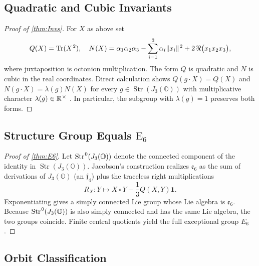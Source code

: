 \documentclass[pdflatex,sn-mathphys-num]{sn-jnl}
\theoremstyle{thmstyleone}
\theoremstyle{thmstyletwo}%
\theoremstyle{thmstylethree}%
\newcommand{\E}[1]{\mathrm{E_{#1}}}
\newcommand{\jalg}{J_3(\mathbb{O})}
\newcommand{\ESix}{\E{6}}
\newcommand{\Tr}{\operatorname{Tr}}
\newcommand{\sm}{\hspace{.065em}}
\newcommand{\Str}{\operatorname{Str}}
\newcommand{\smexp}[1]{^{\sm #1}}
\begin{document}
\begin{appendices}
\subsection{Quadratic and Cubic Invariants}
\label{app:Albert:Invs}

\begin{proof}[Proof of \autoref{thm:Invs}]
For $X$ as above set
\[
  Q(X)=\Tr(X\smexp{2}), 
  \quad
  N(X)=\alpha_{1}\alpha_{2}\alpha_{3}-\sum_{i=1}\smexp{3}\alpha_{i}\|x_{i}\|\smexp{2}
        +2\,\Re\bigl(x_{1}x_{2}x_{3}\bigr),
\]
where juxtaposition is octonion multiplication. The form $Q$ is quadratic and $N$ is cubic in the real coordinates. Direct calculation shows
$
  Q(g \cdot X)=Q(X)
$
and
$
  N(g \cdot X)=\lambda(g)N(X)
$
for every $g\in\Str(\jalg)$ with multiplicative character $\lambda(g)\in\mathbb R\smexp{\times}$ \cite{Jacobson:1968}. In particular, the subgroup with $\lambda(g)=1$ preserves both forms.
\end{proof}

\subsection{Structure Group Equals \texorpdfstring{$\ESix$}{E\_6}}
\label{app:Albert:E6}

\begin{proof}[Proof of \autoref{thm:E6}]
Let $\Str\smexp{0}(\jalg)$ denote the connected component of the identity in $\Str(\jalg)$.
Jacobson’s construction \cite{Jacobson:1968} realizes $\mathfrak e_{6}$ as the sum of derivations of $\jalg$ (an $\mathfrak f_{4}$) plus the traceless right multiplications \[
  R_{X}: Y\mapsto X\circ Y-\frac13 Q(X,Y)\mathbf 1.
\]
Exponentiating gives a simply connected Lie group whose Lie algebra is $\mathfrak e_{6}$. Because $\Str\smexp{0}(\jalg)$ is also simply connected and has the same Lie algebra, the two groups coincide. Finite central quotients yield the full exceptional group $E_{6}$.
\end{proof}

\subsection{Orbit Classification}
\label{app:Albert:OrbitClass}


\end{appendices}
\end{document}
